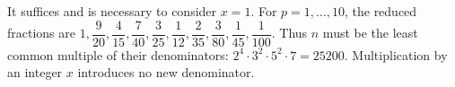 It suffices and is necessary to consider $x=1$. For $p=1,\ldots,10$, the reduced fractions are $1,\dfrac{9}{20},\dfrac{4}{15},\dfrac{7}{40},\dfrac{3}{25},\dfrac{1}{12},\dfrac{2}{35},\dfrac{3}{80},\dfrac{1}{45},\dfrac{1}{100}$. Thus $n$ must be the least common multiple of their denominators: $2^4\cdot3^2\cdot5^2\cdot7=\boxed{25200}$. Multiplication by an integer $x$ introduces no new denominator.
